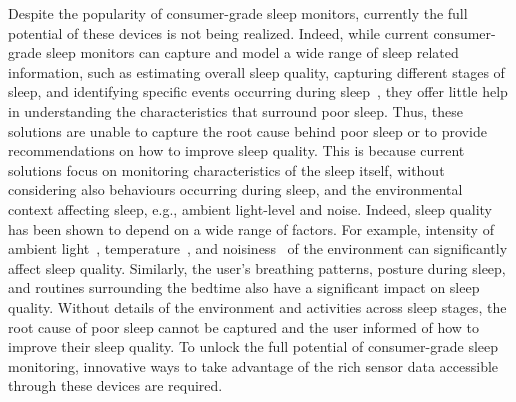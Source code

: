 Despite the popularity of consumer-grade sleep monitors, currently the full potential of these devices is not being realized. Indeed, while current consumer-grade sleep monitors can capture and model a wide range of sleep related information, such as estimating overall sleep quality, capturing different stages of sleep, and identifying specific events occurring during sleep~\cite{kay2012lullaby,zhang2013real,sleepmonitor}, they offer little help in understanding the characteristics that surround poor sleep. Thus, these solutions are unable to capture the root cause behind poor sleep or to provide recommendations on how to improve sleep quality. This is because current solutions focus on monitoring characteristics of the sleep itself, without considering also behaviours occurring during sleep, and the environmental context affecting sleep, e.g., ambient light-level and noise. Indeed, sleep quality has been shown to depend on a wide range of factors. For example, intensity of ambient light~\cite{hood04determinants}, temperature~\cite{urponen88self}, and noisiness~\cite{muzet2007environmental} of the environment can significantly affect sleep quality. Similarly, the user's breathing patterns, posture during sleep, and routines surrounding the bedtime also have a significant impact on sleep quality. Without details of the environment and activities across sleep stages, the root cause of poor sleep cannot be captured and the user informed of how to improve their sleep quality. To unlock the full potential of consumer-grade sleep monitoring, innovative ways to take advantage of the rich sensor data accessible through these devices are required.









